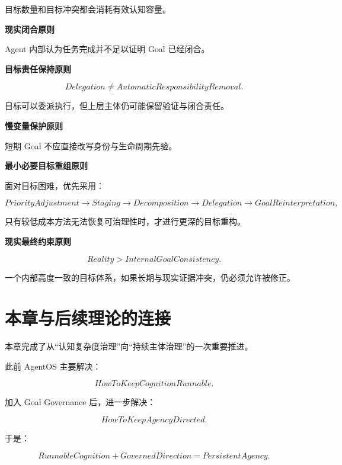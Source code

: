 目标数量和目标冲突都会消耗有效认知容量。


\textbf{现实闭合原则}

\begin{statementbox}
\centering
{}
\end{statementbox}

Agent 内部认为任务完成并不足以证明 Goal 已经闭合。


\textbf{目标责任保持原则}

\[
\boxed{
Delegation
\neq
AutomaticResponsibilityRemoval.
}
\]

目标可以委派执行，但上层主体仍可能保留验证与闭合责任。


\textbf{慢变量保护原则}

\begin{statementbox}
\centering
{}
\end{statementbox}

短期 Goal 不应直接改写身份与生命周期先验。


\textbf{最小必要目标重组原则}

面对目标困难，优先采用：

\[
PriorityAdjustment
\rightarrow
Staging
\rightarrow
Decomposition
\rightarrow
Delegation
\rightarrow
GoalReinterpretation,
\]

只有较低成本方法无法恢复可治理性时，才进行更深的目标重构。


\textbf{现实最终约束原则}

\[
\boxed{
Reality
>
InternalGoalConsistency.
}
\]

一个内部高度一致的目标体系，如果长期与现实证据冲突，仍必须允许被修正。


\section{本章与后续理论的连接}

本章完成了从``认知复杂度治理''向``持续主体治理''的一次重要推进。

此前 AgentOS 主要解决：

\[
\boxed{
HowToKeepCognitionRunnable.
}
\]

加入 Goal Governance 后，进一步解决：

\[
\boxed{
HowToKeepAgencyDirected.
}
\]

于是：

\[
\boxed{
RunnableCognition
+
GovernedDirection
=
PersistentAgency.
}
\]

